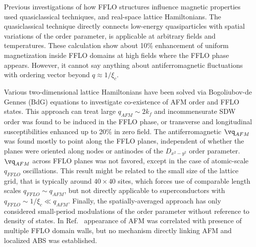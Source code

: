 \documentclass[prb,aps,showpacs,amsmath,twocolumn,10pt]{revtex4-1}
\begin{document}
Previous investigations of how FFLO structures influence magnetic properties used quasiclassical techniques,
and real-space lattice Hamiltonians. 
The quasiclassical technique\cite{Burkhardt1994,Vorontsov:2006fc} 
directly connects low-energy quasiparticles with spatial variations of the order parameter, 
is applicable at arbitrary fields and temperatures. These calculation show about 10\% enhancement of uniform 
magnetization inside FFLO domains at high fields where the FFLO phase appears. 
However, it cannot say anything about antiferromagnetic fluctuations with ordering vector beyond $q \approx 1/\xi_c$. 

Various two-dimensional lattice Hamiltonians have been solved via Bogoliubov-de Gennes (BdG) equations 
to investigate co-existence of AFM order and FFLO states.\cite{Yanase2009, Yanase2009abs, Marcin2009, Yanase2011} 
This approach can treat large $q_{AFM} \sim 2k_f$ and incommensurate SDW order
was found to be induced in the FFLO phase,\cite{Yanase2009,Yanase2009abs} 
or transverse and longitudinal susceptibilities enhanced up to 20\% in zero
field.\cite{Marcin2009}
The antiferromagnetic $\vq_{AFM}$ was found mostly to point along the FFLO
planes,\cite{Yanase2009,Yanase2009abs} 
independent of whether the planes were oriented along nodes or
antinodes of the $D_{x^2-y^2}$ order parameter. 
$\vq_{AFM}$ across FFLO planes was not favored, except in the case of
atomic-scale $q_{FFLO}$ oscillations.\cite{Marcin2009,Yanase2011}
This result might be related to the small size of the lattice grid, that is typically around $40\times40$ sites, 
which forces use of comparable length scales $q_{FFLO} \sim q_{AFM}$, 
but not directly applicable to superconductors with $ q_{FFLO} \sim 1/\xi_c \ll q_{AFM}$. 
Finally, 
the spatially-averaged approach\cite{Marcin2009} has only considered
small-period modulations of the order parameter without reference to density
of states. In Ref.~ 
appearance of AFM was correlated with presence of multiple FFLO domain walls,
but no mechanism directly linking AFM and localized ABS was established. 
\end{document}
